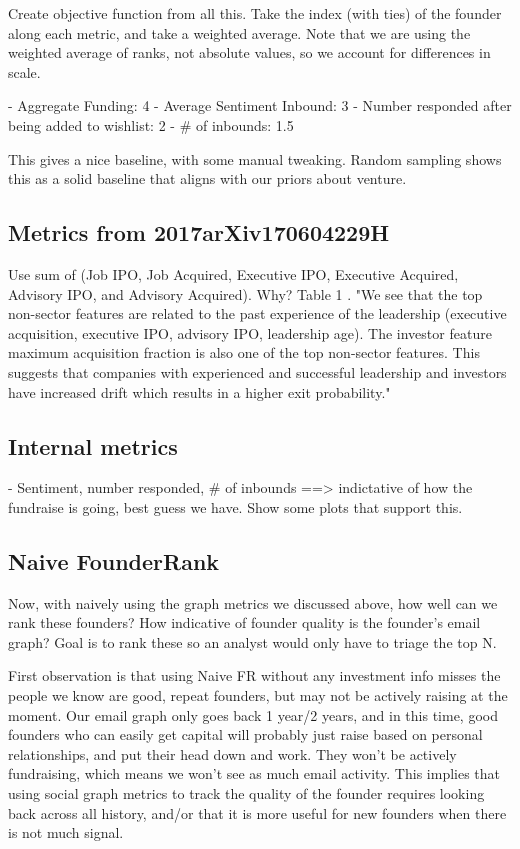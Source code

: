 Create objective function from all this. Take the index (with ties) of the founder along each metric, and take a weighted average. Note that we are using the weighted average of ranks, not absolute values, so we account for differences in scale.

- Aggregate Funding: 4
- Average Sentiment Inbound: 3
- Number responded after being added to wishlist: 2
- \# of inbounds: 1.5

This gives a nice baseline, with some manual tweaking. Random sampling shows this as a solid baseline that aligns with our priors about venture.

\subsection{Metrics from 2017arXiv170604229H}

Use sum of (Job IPO, Job Acquired, Executive IPO, Executive Acquired, Advisory IPO, and Advisory Acquired). Why? Table 1 \cite{2017arXiv170604229H}. "We see that the top non-sector features are related to the past experience of the leadership (executive acquisition, executive IPO, advisory IPO, leadership age). The investor feature maximum acquisition fraction is also one of the top non-sector features. This suggests that companies with experienced and successful leadership and investors have increased drift which results in a higher exit probability."

\subsection{Internal metrics}

- Sentiment, number responded, \# of inbounds ==> indictative of how the fundraise is going, best guess we have. Show some plots that support this.

\subsection{Naive FounderRank}

Now, with naively using the graph metrics we discussed above, how well can we rank these founders? How indicative of founder quality is the founder's email graph? Goal is to rank these so an analyst would only have to triage the top N.

First observation is that using Naive FR without any investment info misses the people we know are good, repeat founders, but may not be actively raising at the moment. Our email graph only goes back 1 year/2 years, and in this time, good founders who can easily get capital will probably just raise based on personal relationships, and put their head down and work. They won't be actively fundraising, which means we won't see as much email activity. This implies that using social graph metrics to track the quality of the founder requires looking back across all history, and/or that it is more useful for new founders when there is not much signal.

